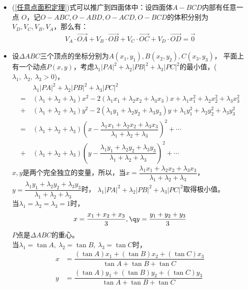 \begin{itemize}[leftmargin=\inteval{\myitemleftmargin}pt,itemsep=
   \inteval{\myitemitempsep}pt,topsep=\inteval{\myitemtopsep}pt]
\item (\ref{任意点面积定理})式可以推广到四面体中：设四面体$ A-BCD $内部有任意一点
$ O $，记$  O-ABC,O-ABD,O-ACD,O-BCD $的体积分别为$V_D,V_C,V_B,V_A $，那么有：
\begin{align*}
    V_A\cdot\vec{OA}+ V_B\cdot\vec{OB}
    +V_C\cdot\vec{OC}+V_D\cdot\vec{OD}= \vec{0}
\end{align*}

\item 设$ \Delta ABC $三个顶点的坐标分别为$ A(x_1,y_1),B(x_2,y_2),C(x_3,y_3) $，
平面上有一个动点$ P(x,y) $，考虑$ \lambda_1|PA|^2+\lambda_2|PB|^2+
\lambda_3|PC|^2 $的最小值，($ \lambda_1,\ \lambda_2,\ \lambda_3>0 $)，
\begin{align*}
    &\ \lambda_1|PA|^2+\lambda_2|PB|^2+\lambda_3|PC|^2 \\
    =&\ (\lambda_1+\lambda_2+\lambda_3)x^2-2(\lambda_1x_1+\lambda_2x_2
    +\lambda_3x_3)x+\lambda_1x_1^2+\lambda_2x_2^2+\lambda_3x_3^2 \\ 
    +&\ (\lambda_1+\lambda_2+\lambda_3)y^2
    -2(\lambda_1y_1+\lambda_2y_2+\lambda_3y_3)y+
    \lambda_1y_1^2+\lambda_2y_2^2+\lambda_3y_3^2 \\
    =&\ (\lambda_1+\lambda_2+\lambda_3)\left(x-\dfrac{\lambda_1x_1+
        \lambda_2x_2+\lambda_3x_3}{\lambda_1
        +\lambda_2+\lambda_3}\right)^2+\cdots \\
    +&\ (\lambda_1+\lambda_2+\lambda_3)\left(y-\dfrac{\lambda_1y_1
        +\lambda_2y_2+\lambda_3y_3}{
        \lambda_1+\lambda_2+\lambda_3}\right)^2+ \cdots
\end{align*}
$ x,y $是两个完全独立的变量，所以，当$ x=\dfrac{\lambda_1x_1+\lambda_2x_2+
    \lambda_3x_3}{\lambda_1+\lambda_2+\lambda_3} $，$ y=\dfrac{\lambda_1y_1+
    \lambda_2y_2+\lambda_3y_3}{\lambda_1+\lambda_2+\lambda_3} $时，
$ \lambda_1|PA|^2+\lambda_2|PB|^2+\lambda_3|PC|^2 $取得极小值。\\
 当$ \lambda_1=\lambda_2=\lambda_3=1 $时，
\begin{gather*}
    x=\dfrac{x_1+x_2+x_3}{3},\q y=\dfrac{y_1+y_2+y_3}{3}
\end{gather*}
$ P $点是$ \Delta ABC $的重心。\\
 当$ \lambda_1=\tan A,\ \lambda_2=\tan B,\ \lambda_3=
\tan C $时，
\begin{align*}
    x &=\dfrac{(\tan A)x_1+(\tan B)x_2+(\tan C)x_3}{\tan A+\tan B+
        \tan C} \\ 
    y &=\dfrac{(\tan A)y_1+(\tan B)y_2+(\tan C)y_3}{\tan A+\tan B+
        \tan C}
\end{align*}

\end{itemize}
